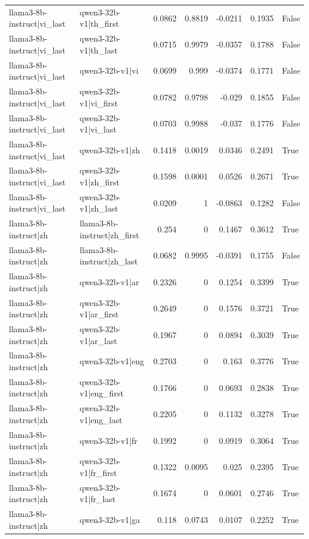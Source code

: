 \begin{table}
\begin{tabular}{l l r r r r l}
llama3-8b-instruct|vi_last & qwen3-32b-v1|th_first & 0.0862 & 0.8819 & -0.0211 & 0.1935 & False \\
llama3-8b-instruct|vi_last & qwen3-32b-v1|th_last & 0.0715 & 0.9979 & -0.0357 & 0.1788 & False \\
llama3-8b-instruct|vi_last & qwen3-32b-v1|vi & 0.0699 & 0.999 & -0.0374 & 0.1771 & False \\
llama3-8b-instruct|vi_last & qwen3-32b-v1|vi_first & 0.0782 & 0.9798 & -0.029 & 0.1855 & False \\
llama3-8b-instruct|vi_last & qwen3-32b-v1|vi_last & 0.0703 & 0.9988 & -0.037 & 0.1776 & False \\
llama3-8b-instruct|vi_last & qwen3-32b-v1|zh & 0.1418 & 0.0019 & 0.0346 & 0.2491 & True \\
llama3-8b-instruct|vi_last & qwen3-32b-v1|zh_first & 0.1598 & 0.0001 & 0.0526 & 0.2671 & True \\
llama3-8b-instruct|vi_last & qwen3-32b-v1|zh_last & 0.0209 & 1 & -0.0863 & 0.1282 & False \\
llama3-8b-instruct|zh & llama3-8b-instruct|zh_first & 0.254 & 0 & 0.1467 & 0.3612 & True \\
llama3-8b-instruct|zh & llama3-8b-instruct|zh_last & 0.0682 & 0.9995 & -0.0391 & 0.1755 & False \\
llama3-8b-instruct|zh & qwen3-32b-v1|ar & 0.2326 & 0 & 0.1254 & 0.3399 & True \\
llama3-8b-instruct|zh & qwen3-32b-v1|ar_first & 0.2649 & 0 & 0.1576 & 0.3721 & True \\
llama3-8b-instruct|zh & qwen3-32b-v1|ar_last & 0.1967 & 0 & 0.0894 & 0.3039 & True \\
llama3-8b-instruct|zh & qwen3-32b-v1|eng & 0.2703 & 0 & 0.163 & 0.3776 & True \\
llama3-8b-instruct|zh & qwen3-32b-v1|eng_first & 0.1766 & 0 & 0.0693 & 0.2838 & True \\
llama3-8b-instruct|zh & qwen3-32b-v1|eng_last & 0.2205 & 0 & 0.1132 & 0.3278 & True \\
llama3-8b-instruct|zh & qwen3-32b-v1|fr & 0.1992 & 0 & 0.0919 & 0.3064 & True \\
llama3-8b-instruct|zh & qwen3-32b-v1|fr_first & 0.1322 & 0.0095 & 0.025 & 0.2395 & True \\
llama3-8b-instruct|zh & qwen3-32b-v1|fr_last & 0.1674 & 0 & 0.0601 & 0.2746 & True \\
llama3-8b-instruct|zh & qwen3-32b-v1|ga & 0.118 & 0.0743 & 0.0107 & 0.2252 & True \\

\end{tabular}
\end{table}
